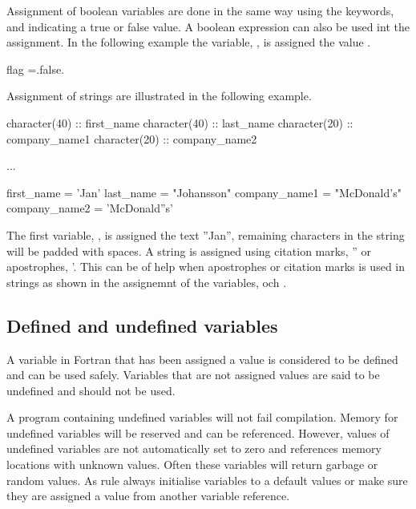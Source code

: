 Assignment of boolean variables are done in the same way using the keywords,  and  indicating a true or false value. A boolean expression can also be used int the assignment. In the following example the variable, , is assigned the value .

\begin{fortrancodeenv}
flag =.false.
\end{fortrancodeenv}

Assignment of strings are illustrated in the following example.

\begin{fortrancodeenv}
character(40) :: first_name
character(40) :: last_name
character(20) :: company_name1
character(20) :: company_name2

...

first_name = 'Jan'
last_name = "Johansson"
company_name1 = "McDonald's"
company_name2 = 'McDonald''s'
\end{fortrancodeenv}

The first variable, , is assigned the text ''Jan'', remaining characters in the string will be padded with spaces. A string is assigned using citation marks, '' or apostrophes, '. This can be of help when apostrophes or citation marks is used in strings as shown in the assignemnt of the variables,  och .

\subsection{Defined and undefined variables}

A variable in Fortran that has been assigned a value is considered to be defined and can be used safely. Variables that are not assigned values are said to be undefined and should not be used.

A program containing undefined variables will not fail compilation. Memory for undefined variables will be reserved and can be referenced. However, values of undefined variables are not automatically set to zero and references memory locations with unknown values. Often these variables will return garbage or random values. As rule always initialise variables to a default values or make sure they are assigned a value from another variable reference.

